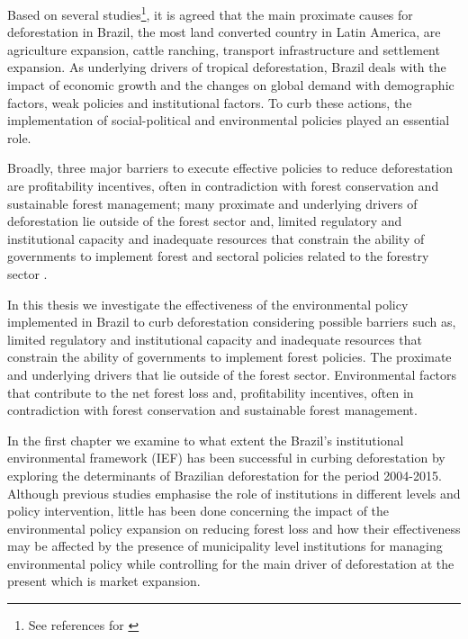 Based on several studies\footnote{See references for \citet{culas11, GEIST, GEIST2, LAMBIN2,RICHARDS,RICHARDS2,CARR2,CABRAL,IMORI,DAVALOS,MOLINA,VALENTIM,PFAFF,PFAFF2,PFAFF3,KUIK,COE,SOLER,ZAMBRANO,NEPSTAD,HAMMIG,ARIMA,ARAUJO,VEIGA,BARRETTO,FARELLA,BARNI,CALDAS,COSTA,PATZ}}, it is agreed that the main proximate causes for deforestation in Brazil, the most land converted country in Latin America, are agriculture expansion, cattle ranching, transport infrastructure and settlement expansion. As underlying drivers of tropical deforestation, Brazil deals with the impact of economic growth and the changes on global demand with demographic factors, weak policies and institutional factors. To curb these actions, the implementation of social-political and environmental policies played an essential role.

Broadly, three major barriers to execute effective policies to reduce deforestation are profitability incentives, often in contradiction with forest conservation and sustainable forest management; many proximate and underlying drivers of deforestation lie outside of the forest sector and, limited regulatory and institutional capacity and inadequate resources that constrain the ability of governments to implement forest and sectoral policies related to the forestry sector \citep{TACCONI,GEROLD,FAO3}. 

In this thesis we investigate the effectiveness of the environmental policy implemented in Brazil to curb deforestation considering possible barriers such as, limited regulatory and institutional capacity and inadequate resources that constrain the ability of governments to implement forest policies. The proximate and underlying drivers that lie outside of the forest sector. Environmental factors that contribute to the net forest loss and, profitability incentives, often in contradiction with forest conservation and sustainable forest management. 

In the first chapter we examine to what extent the Brazil's institutional environmental framework (IEF) has been successful in curbing deforestation by exploring the determinants of Brazilian deforestation for the period 2004-2015. Although previous studies \citep{ARAUJO, OLIVEIRA2,BORGES,NEPSTAD,VALENTIM2,pailler_2018} emphasise the role of institutions in different levels and policy intervention, little has been done concerning the impact of the environmental policy expansion on reducing forest loss and how their effectiveness may be affected by the presence of municipality level institutions for managing environmental policy while controlling for the main driver of deforestation at the present which is market expansion.

